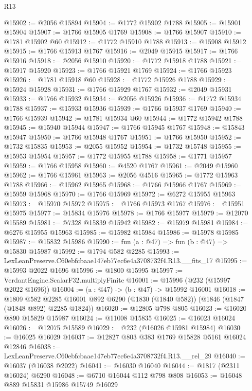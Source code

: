 \begin{lexlean}{R13}
\begin{coremodule}
@15902 := @2056 @15894
@15904 := @1772 @15902 @1788
@15905 := @15901 @15904
@15907 := @1766 @15905 @1769
@15908 := @1766 @15907
@15910 := @1781 @15902 @60
@15912 := @1772 @15910 @1788
@15913 := @15908 @15912
@15915 := @1766 @15913 @1767
@15916 := @2049 @15915
@15917 := @1766 @15916
@15918 := @2056 @15910
@15920 := @1772 @15918 @1788
@15921 := @15917 @15920
@15923 := @1766 @15921 @1769
@15924 := @1766 @15923
@15926 := @1781 @15918 @60
@15928 := @1772 @15926 @1788
@15929 := @15924 @15928
@15931 := @1766 @15929 @1767
@15932 := @2049 @15931
@15933 := @1766 @15932
@15934 := @2056 @15926
@15936 := @1772 @15934 @1788
@15937 := @15933 @15936
@15939 := @1766 @15937 @1769
@15940 := @1766 @15939
@15942 := @1781 @15934 @60
@15944 := @1772 @15942 @1788
@15945 := @15940 @15944
@15947 := @1766 @15945 @1767
@15948 := @15843 @15947
@15950 := @1766 @15948 @1767
@15951 := @1766 @15950
@15952 := @1732 @15835
@15953 := @2055 @15952
@15954 := @1732 @15748
@15955 := @15953 @15954
@15957 := @1772 @15955 @1788
@15958 := @1771 @15957
@15959 := @1766 @15958
@15960 := @4520 @1767
@15961 := @2049 @15960
@15962 := @1766 @15961
@15963 := @2056 @4516
@15965 := @1772 @15963 @1788
@15966 := @15962 @15965
@15968 := @1766 @15966 @1767
@15969 := @15959 @15968
@15970 := @1766 @15969
@15972 := @6272 @15955 @15963
@15973 := @15970 @15972
@15975 := @1766 @15973 @1767
@15976 := @15951 @15975
@15977 := @15834 @15976
@15978 := @1766 @15977
@15979 := @12070 @15589
@15981 := @7328 @15839 @15942
@15982 := @15979 @15981
@15984 := @6276 @15955 @15963
@15985 := @15982 @15984
@15986 := @15978 @15985
@15987 := @15832 @15986
@15990 := fun (a : @47) => fun (b : @47) => @15830 @15987
@15992 := @1794 @582 @2285
@15993 := LexLeanPreserve.C60ebfcbaae147eb77ec6e4a3708732f4.R13.__fits_17
@15995 := @15993 @2022 @1696
@15996 := @1800 @15995
@15997 := VerdantEngine.ScalarF32.multiplyFinite
@16001 := @15996 (@232 (@15997 @2022 @1696))
@16004 := (a : @47) -> (b : @47) -> @15992 @16001
@16018 := @1809
    @582
    @2285
    @16001
    @892
    @6290
    (@1830 (@1840 @582))
    (@1846 (@1847 (@1848 @892) @2285 @1824))
@16020 := @12805 @798 @805
@16023 := @16020 @890 @15829 @15987
@16024 := @11008 @15835
@16025 := @16023 @16024
@16026 := @12075 @15589
@16029 := @232 (@16026 @15981 @15984)
@16030 := @16025 @16029
@16037 := @12827 @803 @383 @1769 @15828 @5161 @16024 @12846
@16038 := LexLeanPreserve.C60ebfcbaae147eb77ec6e4a3708732f4.R13.__rel_29
@16040 := @16037 (@16038 @2022)
@16041 := @16030 @16040
@16044 := @1817 (@2311 @16024) @6290
@16048 := @6710 @16044 @112 @798 @808
@16053 := @16048 @889 @15831 @15986 @15749 @16029

\end{coremodule}
\end{lexlean}
